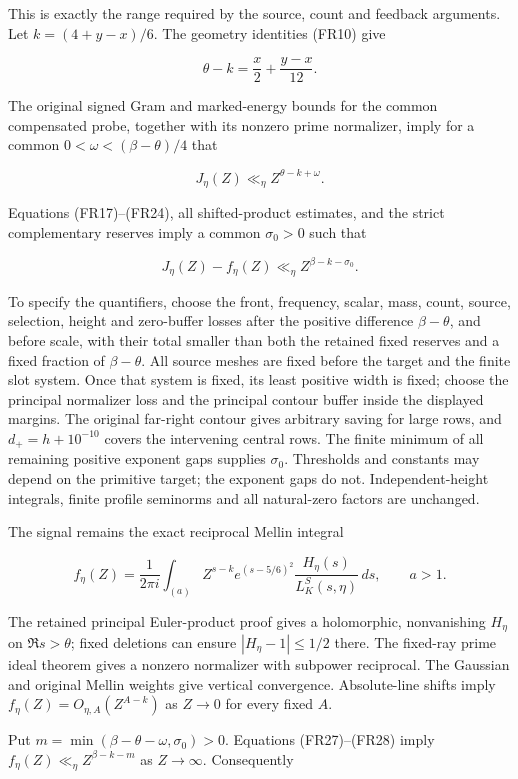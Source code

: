 This is exactly the range required by the source, count and feedback arguments. Let \(k=(4+y-x)/6\). The geometry identities (FR10) give

\[
\theta-k=\frac x2+\frac{y-x}{12}.
\tag{FR26}
\]

The original signed Gram and marked-energy bounds for the common compensated probe, together with its nonzero prime normalizer, imply for a common \(0<\omega<(\beta-\theta)/4\) that

\[
J_\eta(Z)\ll_\eta Z^{\theta-k+\omega}.
\tag{FR27}
\]

Equations (FR17)--(FR24), all shifted-product estimates, and the strict complementary reserves imply a common \(\sigma_0>0\) such that

\[
J_\eta(Z)-f_\eta(Z)\ll_\eta Z^{\beta-k-\sigma_0}.
\tag{FR28}
\]

To specify the quantifiers, choose the front, frequency, scalar, mass, count, source, selection, height and zero-buffer losses after the positive difference \(\beta-\theta\), and before scale, with their total smaller than both the retained fixed reserves and a fixed fraction of \(\beta-\theta\). All source meshes are fixed before the target and the finite slot system. Once that system is fixed, its least positive width is fixed; choose the principal normalizer loss and the principal contour buffer inside the displayed margins. The original far-right contour gives arbitrary saving for large rows, and \(d_+=h+10^{-10}\) covers the intervening central rows. The finite minimum of all remaining positive exponent gaps supplies \(\sigma_0\). Thresholds and constants may depend on the primitive target; the exponent gaps do not. Independent-height integrals, finite profile seminorms and all natural-zero factors are unchanged.

The signal remains the exact reciprocal Mellin integral

\[
f_\eta(Z)=\frac1{2\pi i}\int_{(a)}
 Z^{s-k}e^{(s-5/6)^2}\frac{H_\eta(s)}{L_K^S(s,\eta)}\,ds,
\qquad a>1.
\tag{FR29}
\]

The retained principal Euler-product proof gives a holomorphic, nonvanishing \(H_\eta\) on \(\Re s>\theta\); fixed deletions can ensure \(|H_\eta-1|\le1/2\) there. The fixed-ray prime ideal theorem gives a nonzero normalizer with subpower reciprocal. The Gaussian and original Mellin weights give vertical convergence. Absolute-line shifts imply \(f_\eta(Z)=O_{\eta,A}(Z^{A-k})\) as \(Z\to0\) for every fixed \(A\).

Put \(m=\min(\beta-\theta-\omega,\sigma_0)>0\). Equations (FR27)--(FR28) imply \(f_\eta(Z)\ll_\eta Z^{\beta-k-m}\) as \(Z\to\infty\). Consequently

